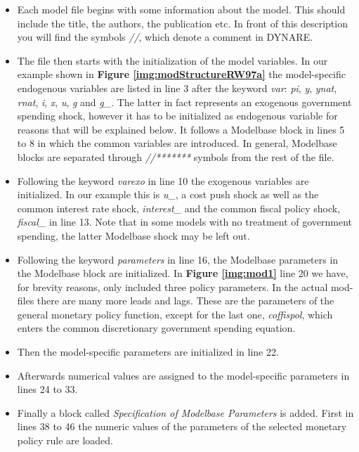 \begin{itemize}
    \item Each model file begins with some information about the model. This should include the
    title, the authors, the publication etc. In front
    of this description you will find the symbols \textit{//}, which denote a comment in DYNARE.
    \item The file then starts with the initialization of the model variables. In our example shown in {\bf Figure
    \ref{img:modStructureRW97a}} the model-specific endogenous variables are listed in line 3 after the keyword \textit{var}:
    \textit{pi}, \textit{y}, \textit{ynat}, \textit{rnat}, \textit{i}, \textit{x}, \textit{u}, \textit{g}
    and \textit{g\_}. The latter in fact represents an exogenous government spending shock, however it has to be
    initialized as endogenous variable for reasons that will be explained below.
    It follows a Modelbase block in lines 5 to 8 in which the common variables are introduced.
    In general, Modelbase blocks are separated through \textit{//*******} symbols from the rest of the file.
    \item Following the keyword \textit{varexo} in line 10 the exogenous variables are initialized.
    In our example this is \textit{u\_}, a cost push shock as well as the common interest rate shock, \textit{interest\_} and
    the common fiscal policy shock, \textit{fiscal\_} in line 13. Note that in some models with no treatment of government spending, the
    latter Modelbase shock may be left out.
    \item Following the keyword \textit{parameters} in line 16, the Modelbase parameters in the Modelbase block are initialized.
    In {\bf Figure \ref{img:mod1}} line 20 we have, for brevity reasons, only included three policy parameters.
    In the actual mod-files there are many more leads and lags. These are the parameters of the
    general monetary policy function, except for the last one, \textit{coffispol},
    which enters the common discretionary government spending equation.
    \item Then the model-specific parameters are initialized in line 22.
    \item Afterwards numerical values are assigned to the model-specific parameters in lines 24 to 33.
    \item Finally a block called \textit{Specification of Modelbase Parameters} is added. First in lines 38 to 46 the numeric
    values of the parameters of the selected monetary policy rule are loaded.

\end{itemize}
